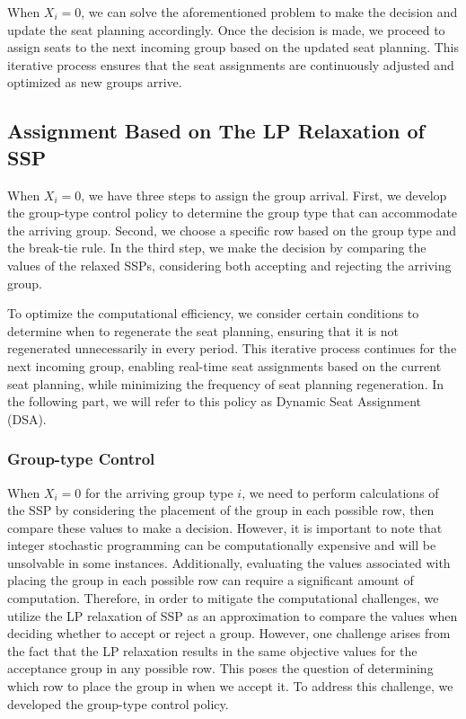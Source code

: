 When $X_i = 0$, we can solve the aforementioned problem to make the decision and update the seat planning accordingly. Once the decision is made, we proceed to assign seats to the next incoming group based on the updated seat planning. This iterative process ensures that the seat assignments are continuously adjusted and optimized as new groups arrive.


\subsection{Assignment Based on The LP Relaxation of SSP}
When $X_i = 0$, we have three steps to assign the group arrival. First, we develop the group-type control policy to determine the group type that can accommodate the arriving group. Second, we choose a specific row based on the group type and the break-tie rule. In the third step, we make the decision by comparing the values of the relaxed SSPs, considering both accepting and rejecting the arriving group.

To optimize the computational efficiency, we consider certain conditions to determine when to regenerate the seat planning, ensuring that it is not regenerated unnecessarily in every period. This iterative process continues for the next incoming group, enabling real-time seat assignments based on the current seat planning, while minimizing the frequency of seat planning regeneration. In the following part, we will refer to this policy as Dynamic Seat Assignment (DSA).


\subsubsection{Group-type Control}\label{nested_policy}

When $X_i = 0$ for the arriving group type $i$, we need to perform calculations of the SSP by considering the placement of the group in each possible row, then compare these values to make a decision. However, it is important to note that integer stochastic programming can be computationally expensive and will be unsolvable in some instances. Additionally, evaluating the values associated with placing the group in each possible row can require a significant amount of computation. Therefore, in order to mitigate the computational challenges, we utilize the LP relaxation of SSP as an approximation to compare the values when deciding whether to accept or reject a group. However, one challenge arises from the fact that the LP relaxation results in the same objective values for the acceptance group in any possible row. This poses the question of determining which row to place the group in when we accept it. To address this challenge, we developed the group-type control policy.


